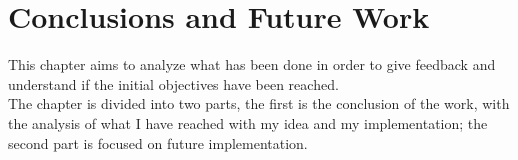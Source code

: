 %
%
\chapter{Conclusions and Future Work}
%
\label{cap:conclusions}
%
%
This chapter aims to analyze what has been done in order to give feedback
and understand if the initial objectives have been reached.\\
The chapter is divided into two parts, the first is the conclusion of the work, with
the analysis of what I have reached with my idea and my implementation; the
second part is focused on future implementation.
